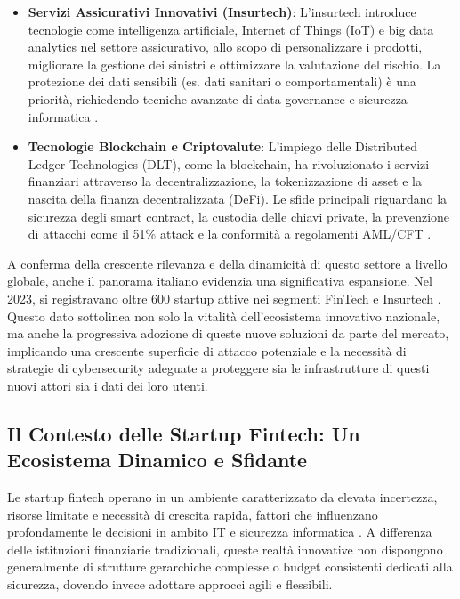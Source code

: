 \begin{itemize}
    \item \textbf{Servizi Assicurativi Innovativi (Insurtech)}: L’insurtech introduce tecnologie come intelligenza artificiale, Internet of Things (IoT) e big data analytics nel settore assicurativo, allo scopo di personalizzare i prodotti, migliorare la gestione dei sinistri e ottimizzare la valutazione del rischio. La protezione dei dati sensibili (es. dati sanitari o comportamentali) è una priorità, richiedendo tecniche avanzate di data governance e sicurezza informatica \cite{eling2018insurtech}.
    
    \item \textbf{Tecnologie Blockchain e Criptovalute}: L'impiego delle Distributed Ledger Technologies (DLT), come la blockchain, ha rivoluzionato i servizi finanziari attraverso la decentralizzazione, la tokenizzazione di asset e la nascita della finanza decentralizzata (DeFi). Le sfide principali riguardano la sicurezza degli smart contract, la custodia delle chiavi private, la prevenzione di attacchi come il 51\% attack e la conformità a regolamenti AML/CFT \cite{catalini2016blockchain}.
    \end{itemize}

A conferma della crescente rilevanza e della dinamicità di questo settore a livello globale, anche il panorama italiano evidenzia una significativa espansione. Nel 2023, si registravano oltre 600 startup attive nei segmenti FinTech e Insurtech \cite{fintech_numeri}. Questo dato sottolinea non solo la vitalità dell'ecosistema innovativo nazionale, ma anche la progressiva adozione di queste nuove soluzioni da parte del mercato, implicando una crescente superficie di attacco potenziale e la necessità di strategie di cybersecurity adeguate a proteggere sia le infrastrutture di questi nuovi attori sia i dati dei loro utenti.
\subsection{Il Contesto delle Startup Fintech: Un Ecosistema Dinamico e Sfidante}

Le startup fintech operano in un ambiente caratterizzato da elevata incertezza, risorse limitate e necessità di crescita rapida, fattori che influenzano profondamente le decisioni in ambito IT e sicurezza informatica \cite{fintechChallenges}. A differenza delle istituzioni finanziarie tradizionali, queste realtà innovative non dispongono generalmente di strutture gerarchiche complesse o budget consistenti dedicati alla sicurezza, dovendo invece adottare approcci agili e flessibili.

